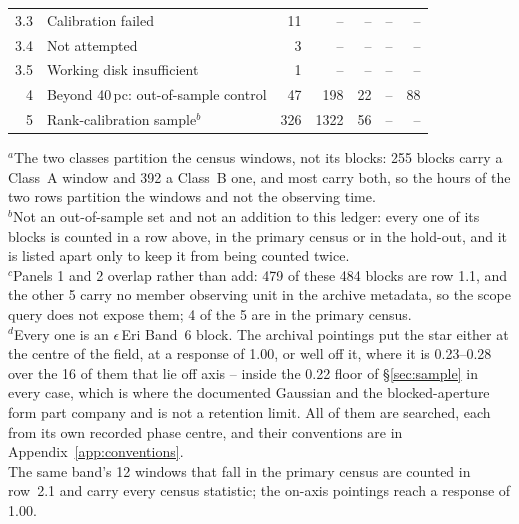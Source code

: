 \begin{tabular}{@{}r@{~}p{}rrrrr@{}}
3.3 & \hspace{0.8em}Calibration failed & 11 & -- & -- & -- & -- \\
3.4 & \hspace{0.8em}Not attempted & 3 & -- & -- & -- & -- \\
3.5 & \hspace{0.8em}Working disk insufficient & 1 & -- & -- & -- & -- \\
\hline
4 & Beyond 40\,pc: out-of-sample control & 47 & 198 & 22 & -- & 88 \\
5 & Rank-calibration sample$^{b}$ & 326 & 1322 & 56 & -- & -- \\
\hline
\end{tabular}

{\footnotesize\raggedright $^{a}$The two classes partition the census windows, not its blocks: 255 blocks carry a Class~A window and 392 a Class~B one, and most carry both, so the hours of the two rows partition the windows and not the observing time.\\ $^{b}$Not an out-of-sample set and not an addition to this ledger: every one of its blocks is counted in a row above, in the primary census or in the hold-out, and it is listed apart only to keep it from being counted twice.\\ $^{c}$Panels 1 and 2 overlap rather than add: 479 of these 484 blocks are row 1.1, and the other 5 carry no member observing unit in the archive metadata, so the scope query does not expose them; 4 of the 5 are in the primary census.\\ $^{d}$Every one is an $\epsilon$\,Eri Band~6 block. The archival pointings put the star either at the centre of the field, at a response of 1.00, or well off it, where it is 0.23--0.28 over the 16 of them that lie off axis -- inside the 0.22 floor of \S\ref{sec:sample} in every case, which is where the documented Gaussian and the blocked-aperture form part company and is not a retention limit. All of them are searched, each from its own recorded phase centre, and their conventions are in Appendix~\ref{app:conventions}.\\ The same band's 12 windows that fall in the primary census are counted in row~2.1 and carry every census statistic; the on-axis pointings reach a response of 1.00.}
